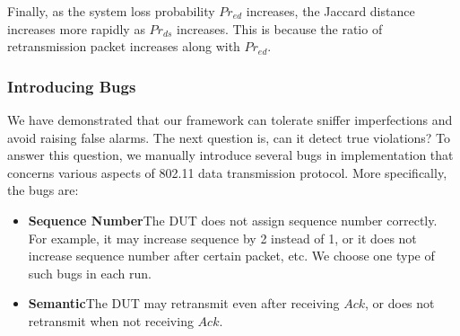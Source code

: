 Finally, as the system loss probability $Pr_{ed}$ increases, the Jaccard
distance increases more rapidly as $Pr_{ds}$ increases.  This is because the
ratio of retransmission packet increases along with $Pr_{ed}$.

\vspace*{-3mm}
\subsubsection{Introducing Bugs}

We have demonstrated that our framework can tolerate sniffer imperfections and
avoid raising false alarms.  The next question is, can it detect true
violations?  To answer this question, we manually introduce several bugs in
\ns{} implementation that concerns various aspects of 802.11 data transmission
protocol.  More specifically, the bugs are:

\begin{itemize}
  \item \textbf{Sequence Number}\quad The DUT does not assign sequence number
    correctly. For example, it may increase sequence by 2 instead of 1, or it
    does not increase sequence number after certain packet, etc. We choose one
    type of such bugs in each run.
  \item \textbf{Semantic}\quad The DUT may retransmit even
    after receiving $Ack$, or does not retransmit when not receiving $Ack$.
\end{itemize}

